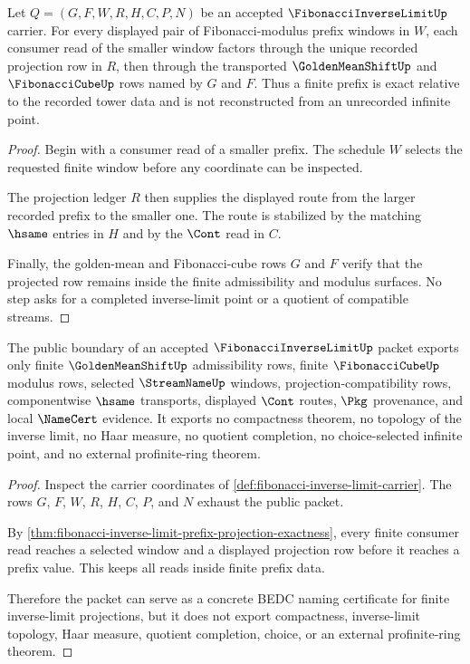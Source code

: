\begin{theorem}
\label{thm:fibonacci-inverse-limit-prefix-projection-exactness}
Let $Q=(G,F,W,R,H,C,P,N)$ be an accepted $\FibonacciInverseLimitUp$ carrier. For every displayed pair of Fibonacci-modulus prefix windows in $W$, each consumer read of the smaller window factors through the unique recorded projection row in $R$, then through the transported $\GoldenMeanShiftUp$ and $\FibonacciCubeUp$ rows named by $G$ and $F$. Thus a finite prefix is exact relative to the recorded tower data and is not reconstructed from an unrecorded infinite point.
\end{theorem}
\begin{proof}
Begin with a consumer read of a smaller prefix. The schedule $W$ selects the requested finite window before any coordinate can be inspected.

The projection ledger $R$ then supplies the displayed route from the larger recorded prefix to the smaller one. The route is stabilized by the matching $\hsame$ entries in $H$ and by the $\Cont$ read in $C$.

Finally, the golden-mean and Fibonacci-cube rows $G$ and $F$ verify that the projected row remains inside the finite admissibility and modulus surfaces. No step asks for a completed inverse-limit point or a quotient of compatible streams.
\end{proof}

\begin{theorem}
\label{thm:fibonacci-inverse-limit-ledger-non-escape}
The public boundary of an accepted $\FibonacciInverseLimitUp$ packet exports only finite $\GoldenMeanShiftUp$ admissibility rows, finite $\FibonacciCubeUp$ modulus rows, selected $\StreamNameUp$ windows, projection-compatibility rows, componentwise $\hsame$ transports, displayed $\Cont$ routes, $\Pkg$ provenance, and local $\NameCert$ evidence. It exports no compactness theorem, no topology of the inverse limit, no Haar measure, no quotient completion, no choice-selected infinite point, and no external profinite-ring theorem.
\end{theorem}
\begin{proof}
Inspect the carrier coordinates of \autoref{def:fibonacci-inverse-limit-carrier}. The rows $G$, $F$, $W$, $R$, $H$, $C$, $P$, and $N$ exhaust the public packet.

By \autoref{thm:fibonacci-inverse-limit-prefix-projection-exactness}, every finite consumer read reaches a selected window and a displayed projection row before it reaches a prefix value. This keeps all reads inside finite prefix data.

Therefore the packet can serve as a concrete BEDC naming certificate for finite inverse-limit projections, but it does not export compactness, inverse-limit topology, Haar measure, quotient completion, choice, or an external profinite-ring theorem.
\end{proof}

